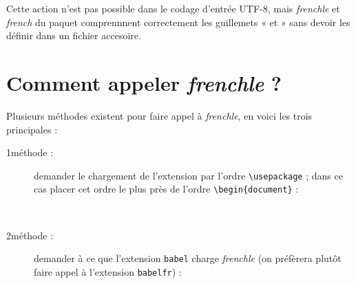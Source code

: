 \documentclass[a4paper,12pt,openright]{article}
\begin{document}
Cette action n'est pas possible dans le codage d'entrée UTF-8, mais \textsl{frenchle} et 
\textsl{french} du paquet \textsl{\befr} comprennnent correctement les guillemets 
« et » sans devoir les définir dans un fichier accesoire.

\section{Comment appeler \textit{frenchle} ?}
Plusieurs méthodes existent pour faire appel à \textit{frenchle}, en voici les trois
principales :
\begin{description}
\item[1\iere méthode :] demander le chargement de l’extension par l’ordre \verb|\usepackage| ;
dans ce cas placer cet ordre le plus près de l’ordre \verb|\begin{document}| :\\[.5em]
\rule{0pt}{1em}\hfill{}\hfill\rule{0pt}{1em}\\[.5em]
\item[2\ieme méthode :] demander à ce que l’extension \texttt{babel}
 charge \textit{frenchle} (on préfèrera
plutôt faire appel à l’extension \texttt{babelfr}) :\\[.5em]
\rule{0pt}{1em}\hfill{}\hfill\rule{0pt}{1em}\\[.5em]


\end{description}
\end{document}
